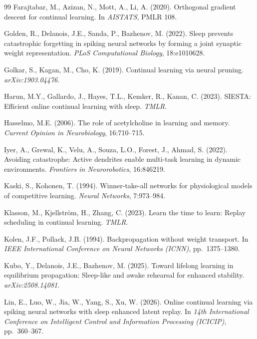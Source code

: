 \documentclass{article}
\begin{document}
\begin{thebibliography}{99}
 Farajtabar, M., Azizan, N., Mott, A., Li, A. (2020). Orthogonal gradient descent for continual learning. In \emph{AISTATS}, PMLR 108.

 Golden, R., Delanois, J.E., Sanda, P., Bazhenov, M. (2022). Sleep prevents catastrophic forgetting in spiking neural networks by forming a joint synaptic weight representation. \emph{PLoS Computational Biology}, 18:e1010628.

 Golkar, S., Kagan, M., Cho, K. (2019). Continual learning via neural pruning. \emph{arXiv:1903.04476}.

 Harun, M.Y., Gallardo, J., Hayes, T.L., Kemker, R., Kanan, C. (2023). SIESTA: Efficient online continual learning with sleep. \emph{TMLR}.

 Hasselmo, M.E. (2006). The role of acetylcholine in learning and memory. \emph{Current Opinion in Neurobiology}, 16:710--715.

 Iyer, A., Grewal, K., Velu, A., Souza, L.O., Forest, J., Ahmad, S. (2022). Avoiding catastrophe: Active dendrites enable multi-task learning in dynamic environments. \emph{Frontiers in Neurorobotics}, 16:846219.

 Kaski, S., Kohonen, T. (1994). Winner-take-all networks for physiological models of competitive learning. \emph{Neural Networks}, 7:973--984.

 Klasson, M., Kjellstr\"om, H., Zhang, C. (2023). Learn the time to learn: Replay scheduling in continual learning. \emph{TMLR}.

 Kolen, J.F., Pollack, J.B. (1994). Backpropagation without weight transport. In \emph{IEEE International Conference on Neural Networks (ICNN)}, pp.\ 1375--1380.

 Kubo, Y., Delanois, J.E., Bazhenov, M. (2025). Toward lifelong learning in equilibrium propagation: Sleep-like and awake rehearsal for enhanced stability. \emph{arXiv:2508.14081}.

 Lin, E., Luo, W., Jia, W., Yang, S., Xu, W. (2026). Online continual learning via spiking neural networks with sleep enhanced latent replay. In \emph{14th International Conference on Intelligent Control and Information Processing (ICICIP)}, pp.\ 360--367.


\end{thebibliography}
\end{document}
